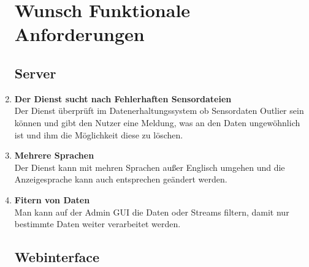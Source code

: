 \begin{enumerate}[label=\textbf{WF\arabic{enumi}0}]
	\setcounter{enumi}{99}
	\section{Wunsch Funktionale Anforderungen}
	
	\subsection{Server}
	
	\item \textbf{Der Dienst sucht nach Fehlerhaften Sensordateien}\\
	Der Dienst überprüft im Datenerhaltungssystem ob Sensordaten Outlier sein können und gibt den Nutzer eine Meldung, was an den Daten ungewöhnlich ist und ihm die Möglichkeit diese zu löschen.
	 
	\item \textbf{Mehrere Sprachen}\\
	Der Dienst kann mit mehren Sprachen außer Englisch umgehen und die Anzeigesprache kann auch entsprechen geändert werden. 
	
	\item \textbf{Fitern von Daten}\\
	Man kann auf der Admin GUI die Daten oder Streams filtern, damit nur bestimmte Daten weiter verarbeitet werden.
	
		
	\subsection{Webinterface}
\end{enumerate}
	
	 
	  
